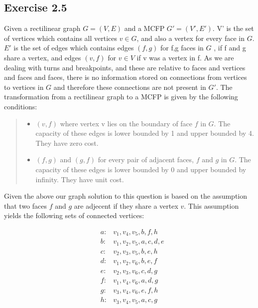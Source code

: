 \subsection{Exercise 2.5}
Given a rectilinear graph \(G = (V,E)\) and a MCFP \(G' = (V',E')\). V'  is the set of vertices which contains all vertices \(v \in G\), and also a vertex for every face in \(G\).  \(E'\) is the set of edges which contains edges \((f,g)\) for f,g faces in \(G\) , if f and g share a vertex, and edges \((v,f)\) for \(v \in V\) if v was a vertex in f. As we are dealing with turns and breakpoints, and these are relative to faces and vertices and faces and faces, there is no information stored on connections from vertices to vertices in \(G\) and therefore these connections are not present in \(G'\). 
The transformation from a rectilinear graph to a MCFP is given by the following conditions:
\begin{quote}
  \begin{itemize}
    \item{} \((v,f)\) where vertex v lies on the boundary of face \(f\) in \(G\). The capacity of these
        edges is lower bounded by 1 and upper bounded by 4. They have zero cost.
    \item{} \((f,g)\) and \((g,f)\) for every pair of adjacent faces, \(f\) and \(g\) in \(G\). The capacity of these edges is lower bounded by 0 and upper bounded by infinity. They have unit cost.
  \end{itemize}
\end{quote}

Given the above our graph solution to this question is based on the assumption that two faces \(f\) and \(g\) are adjecent if they share a vertex \(v\). This assumption yields the following sets of connected vertices:

\begin{align}
  &a:& {v_1, v_4, v_5, b, f, h}\\
  &b:& {v_1, v_2, v_5, a,c, d, e}\\
  &c:& {v_2, v_3, v_5, b, e, h}\\
  &d:& {v_1, v_2, v_6, b,e, f}\\
  &e:& {v_2, v_3, v_6, c, d, g}\\
  &f:& {v_1, v_4, v_6, a, d, g}\\
  &g:& {v_3, v_4, v_6, e, f, h}\\
  &h:& {v_3, v_4, v_5,a, c,g}
\end{align}

